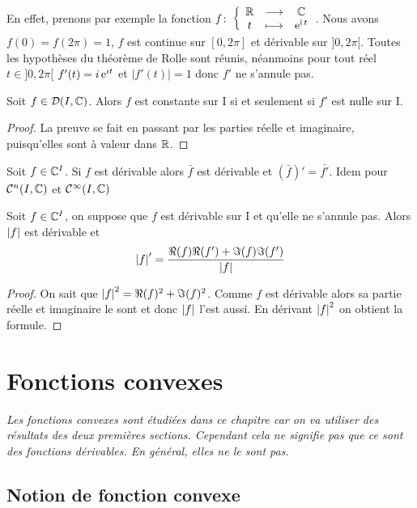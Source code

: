 En effet, prenons par exemple la fonction \(f\colon \left\{\begin{array}{ccc} \mathbb{R} & \longrightarrow &\mathbb{C}\\ t & \longmapsto & \operatorname{e}^{\operatorname{i} 
t} \end{array} \right.\). Nous avons \(f(0)=f(2\pi)=1\), \(f\) est continue sur \([0,2\pi]\) et 
dérivable sur \(]0,2\pi[\). Toutes les hypothèses du théorème de Rolle sont 
réunis, néanmoins pour tout réel \(t \in ]0,2\pi[\) \(f'(t)=i \operatorname{e}^{it}\) et 
\(|f'(t)|=1\) donc \(f'\) ne s'annule pas.

\begin{theo}
  Soit \(f \in \mathcal{D}(I,\mathbb{C})\). Alors \(f\) est constante sur I si et seulement 
  si \(f'\) est nulle sur I.
\end{theo}
\begin{proof}
  La preuve se fait en passant par les parties réelle et imaginaire, 
  puisqu'elles sont à valeur dans \(\mathbb{R}\).
\end{proof}
\begin{prop}
  Soit \(f \in \mathbb{C}^I\). Si \(f\) est dérivable alors \(\bar{f}\) est dérivable et 
  \(\left(\bar{f}\right)'=\bar{f'}\). Idem pour \(\mathcal{C}^{n}(I,\mathbb{C})\) et 
  \(\mathcal{C}^{\infty}(I,\mathbb{C})\)
\end{prop}
\begin{prop}
  Soit \(f \in \mathbb{C}^I\), on suppose que \(f\) est dérivable sur I et qu'elle ne 
  s'annule pas. Alors \(\left\lvert f\right\rvert\) est dérivable et
  \begin{equation}
    \left\lvert f\right\rvert'=\frac{\Re(f)\Re(f') + \Im(f)\Im(f')}{\left\lvert f\right\rvert}
  \end{equation}
\end{prop}
\begin{proof}
  On sait que \(\left\lvert f\right\rvert^2=\Re(f)^2+\Im(f)^2\). Comme \(f\) est dérivable alors 
  sa partie réelle et imaginaire le sont et donc \(\left\lvert f\right\rvert\) l'est aussi. En 
  dérivant \(\left\lvert f\right\rvert^2\) on obtient la formule.
\end{proof}

\section{Fonctions convexes}

\emph{Les fonctions convexes sont étudiées dans ce chapitre car on va utiliser 
des résultats des deux premières sections. Cependant cela ne signifie pas que ce 
sont des fonctions dérivables. En général, elles ne le sont pas.}

\subsection{Notion de fonction convexe}

